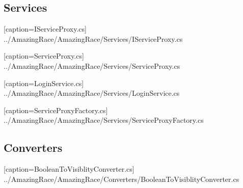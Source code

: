 \documentclass[a4paper,ngerman]{scrartcl}
\begin{document}
\subsection{Services}

[caption=IServiceProxy.cs]
{../AmazingRace/AmazingRace/Services/IServiceProxy.cs}


[caption=ServiceProxy.cs]
{../AmazingRace/AmazingRace/Services/ServiceProxy.cs}


[caption=LoginService.cs]
{../AmazingRace/AmazingRace/Services/LoginService.cs}


[caption=ServiceProxyFactory.cs]
{../AmazingRace/AmazingRace/Services/ServiceProxyFactory.cs}


\subsection{Converters}

[caption=BooleanToVisiblityConverter.cs]
{../AmazingRace/AmazingRace/Converters/BooleanToVisiblityConverter.cs}
\end{document}
